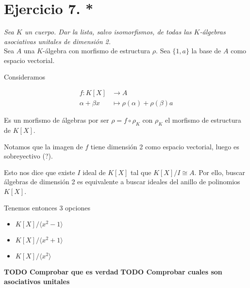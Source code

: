 \section{Ejercicio 7. *} \emph{Sea \(K\) un cuerpo. Dar la lista, salvo isomorfismos, de
todas las \(K\)-álgebras asociativas unitales de dimensión 2.}\\

Sea \(A\) una \(K\)-álgebra con morfismo de estructura \(\rho\). Sea \(\{1,
a\}\) la base de \(A\) como espacio vectorial.


Consideramos

\[
  \begin{aligned}
    f:K[X] &\to A \\
    \alpha + \beta x &\mapsto \rho(\alpha) + \rho(\beta)a
  \end{aligned}
\]

Es un morfismo de álgebras por ser \(\rho = f \circ \rho_K\) con \(\rho_K\) el
morfismo de estructura de \(K[X]\).

Notamos que la imagen de \(f\) tiene dimensión 2 como espacio vectorial, luego
es sobreyectivo (?).

Esto nos dice que existe \(I\) ideal de \(K[X]\) tal que \(K[X]/I \cong A\). Por
ello, buscar álgebras de dimensión 2 es equivalente a buscar ideales del anillo
de polinomios \(K[X]\).

Tenemos entonces 3 opciones
\begin{itemize}
\item \(K[X]/\langle x^2-1 \rangle\)
\item \(K[X]/\langle x^2+1\rangle\)
\item \(K[X]/\langle x^2\rangle\)
\end{itemize}

\textbf{TODO Comprobar que es verdad}
\textbf{TODO Comprobar cuales son asociativos unitales}
